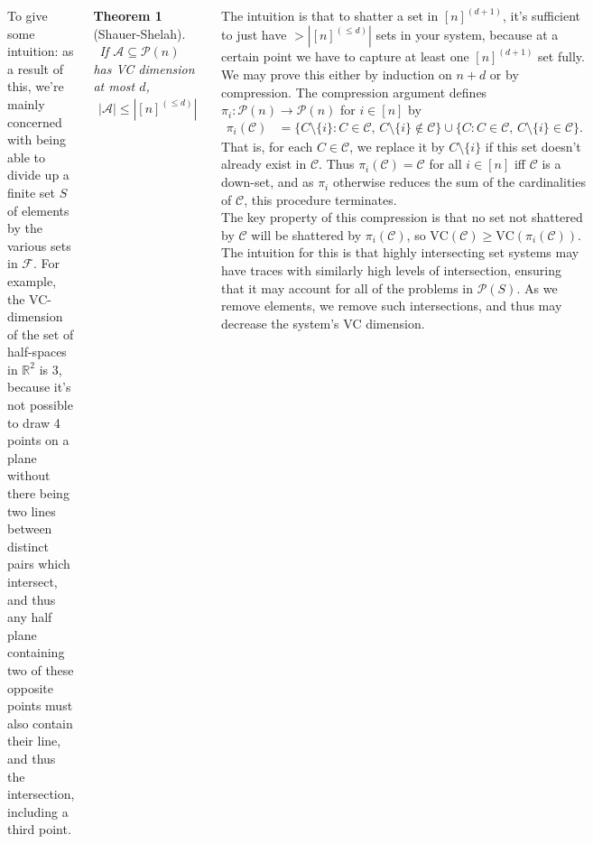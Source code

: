 \documentclass{tikzposter} %
\newcommand{\mc}{\mathcal}
\newtheorem{theorem}{Theorem}
\begin{document}
\begin{columns}
{      To give some intuition: as a result of this, we're mainly concerned with being able to divide up a finite set $S$ of elements by the various sets in $\mc{F}$. For example, the VC-dimension of the set of half-spaces in $\mathbb{R}^2$ is 3, because it's not possible to draw 4 points on a plane without there being two lines between distinct pairs which intersect, and thus any half plane containing two of these opposite points must also contain their line, and thus the intersection, including a third point. \\

      \begin{theorem}[Shauer-Shelah]
      \ If $\mc{A} \subseteq \mc{P}(n)$ has VC dimension at most $d$,
      \begin{align*}
        |\mc{A}| \le \left|[n]^{(\le d)}\right|
      \end{align*}
      \end{theorem}

      The intuition is that to shatter a set in $[n]^{(d+1)}$, it's sufficient to just have $> \left|[n]^{(\le d)}\right|$ sets in your system, because at a certain point we have to capture at least one $[n]^{(d+1)}$ set fully. \\

      We may prove this either by induction on $n+d$ or by compression. The compression argument defines $\pi_i : \mc{P}(n) \to \mc{P}(n)$ for $i \in [n]$ by
      \begin{align*}
        \pi_i(\mc{C}) &= \{C \setminus \{i\} : C \in \mc{C},\, C \setminus \{i\} \not\in \mc{C}\} \cup \{C : C \in \mc{C},\, C \setminus \{i\} \in \mc{C} \}.
      \end{align*}
      That is, for each $C \in \mc{C}$, we replace it by $C \setminus \{i\}$ if this set doesn't already exist in $\mc{C}$. Thus $\pi_i(\mc{C}) = \mc{C}$ for all $i \in [n]$ iff $\mc{C}$ is a down-set, and as $\pi_i$ otherwise reduces the sum of the cardinalities of $\mc{C}$, this procedure terminates. \\

      The key property of this compression is that no set not shattered by $\mc{C}$ will be shattered by $\pi_i(\mc{C})$, so $\mathrm{VC}(\mc{C}) \ge \mathrm{VC}(\pi_i(\mc{C}))$. The intuition for this is that highly intersecting set systems may have traces with similarly high levels of intersection, ensuring that it may account for all of the problems in $\mc{P}(S)$. As we remove elements, we remove such intersections, and thus may decrease the system's VC dimension. \\

}
\end{columns}
\end{document}
